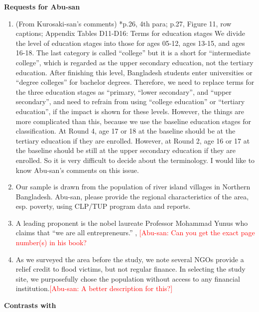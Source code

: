 \textbf{Requests for Abu-san}
\begin{enumerate}
\vspace{1.0ex}\setlength{\itemsep}{1.0ex}\setlength{\baselineskip}{12pt}
\item	(From Kurosaki-san's comments) *p.26, 4th para; p.27, Figure 11, row captions; Appendix Tables D11-D16: Terms for education stages
We divide the level of education stages into those for ages 05-12, ages 13-15, and ages 16-18. The last category is called ``college'' but it is a short for ``intermediate college'', which is regarded as the upper secondary education, not the tertiary education. After finishing this level, Bangladesh students enter universities or ``degree colleges'' for bachelor degrees. Therefore, we need to replace terms for the three education stages as ``primary, ``lower secondary'', and ``upper secondary'', and need to refrain from using ``college education'' or ``tertiary education'', if the impact is shown for these levels. However, the things are more complicated than this, because we use the baseline education stages for classification. At Round 4, age 17 or 18 at the baseline should be at the tertiary education if they are enrolled. However, at Round 2, age 16 or 17 at the baseline should be still at the upper secondary education if they are enrolled. So it is very difficult to decide about the terminology. I would like to know Abu-san’s comments on this issue.
\item		Our sample is drawn from the population of river island villages in Northern Bangladesh. Abu-san, please provide the regional characteristics of the area, esp. poverty, using CLP/TUP program data and reports.
\item	A leading proponent is the nobel laureate Professor Mohammad Yunus who claims that ``we are all entrepreneurs.'' \citep{Yunus2003}, \citep{Cosic2017} \textcolor{red}{[Abu-san: Can you get the exact page number(s) in his book?}
\item	As we surveyed the area before the study, we note several NGOs provide a relief credit to flood victims, but not regular finance. In selecting the study site, we purposefully chose the population without access to any financial institution.\textcolor{red}{[Abu-san: A better description for this?]}
\end{enumerate}


\textbf{\textbf{Contrasts with \citet{Balboni2020}}}
\setlength{\parindent}{1em}

